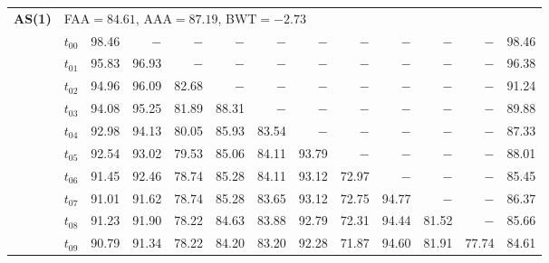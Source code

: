 \begin{table}[ht]
\begin{tabular}{@{}l l r r r r r r r r r r r@{}}
\midrule
\multirow{11}{*}{\textbf{AS(1)}} & \multicolumn{12}{l}{\quad\small FAA$=84.61$,\; AAA$=87.19$,\; BWT$=-2.73$} \\
 & $t_{00}$ & 98.46 & $-$ & $-$ & $-$ & $-$ & $-$ & $-$ & $-$ & $-$ & $-$ & 98.46 \\
 & $t_{01}$ & 95.83 & 96.93 & $-$ & $-$ & $-$ & $-$ & $-$ & $-$ & $-$ & $-$ & 96.38 \\
 & $t_{02}$ & 94.96 & 96.09 & 82.68 & $-$ & $-$ & $-$ & $-$ & $-$ & $-$ & $-$ & 91.24 \\
 & $t_{03}$ & 94.08 & 95.25 & 81.89 & 88.31 & $-$ & $-$ & $-$ & $-$ & $-$ & $-$ & 89.88 \\
 & $t_{04}$ & 92.98 & 94.13 & 80.05 & 85.93 & 83.54 & $-$ & $-$ & $-$ & $-$ & $-$ & 87.33 \\
 & $t_{05}$ & 92.54 & 93.02 & 79.53 & 85.06 & 84.11 & 93.79 & $-$ & $-$ & $-$ & $-$ & 88.01 \\
 & $t_{06}$ & 91.45 & 92.46 & 78.74 & 85.28 & 84.11 & 93.12 & 72.97 & $-$ & $-$ & $-$ & 85.45 \\
 & $t_{07}$ & 91.01 & 91.62 & 78.74 & 85.28 & 83.65 & 93.12 & 72.75 & 94.77 & $-$ & $-$ & 86.37 \\
 & $t_{08}$ & 91.23 & 91.90 & 78.22 & 84.63 & 83.88 & 92.79 & 72.31 & 94.44 & 81.52 & $-$ & 85.66 \\
 & $t_{09}$ & 90.79 & 91.34 & 78.22 & 84.20 & 83.20 & 92.28 & 71.87 & 94.60 & 81.91 & 77.74 & 84.61 \\
\bottomrule
\end{tabular}
\end{table}
